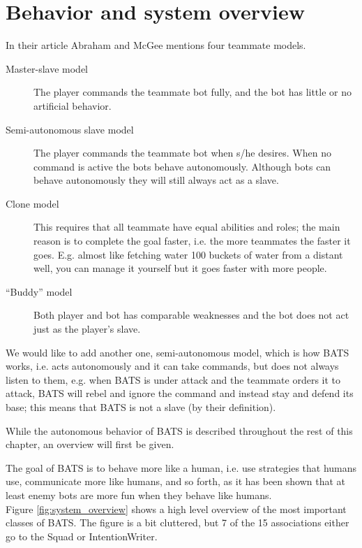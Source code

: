\section{Behavior and system overview}
In their article\cite{abraham10} Abraham and McGee mentions four teammate models.
\begin{description}
	\item[Master-slave model] The player commands the teammate bot fully, and the bot has little or
	  no artificial behavior.
	\item[Semi-autonomous slave model] The player commands the teammate bot when s/he desires. When
	  no command is active the bots behave autonomously. Although bots can behave autonomously they
	  will still always act as a slave.
	\item[Clone model] This requires that all teammate have equal abilities and roles; the main
	  reason is to complete the goal faster, i.e. the more teammates the faster it goes. E.g. almost
	  like fetching water 100 buckets of water from a distant well, you can manage it yourself but
	  it goes faster with more people.
	\item[“Buddy” model] Both player and bot has comparable weaknesses and the bot does not act just
	  as the player’s slave.
\end{description}
We would like to add another one, semi-autonomous model, which is how BATS works, i.e. acts
autonomously and it can take commands, but does not always listen to them, e.g. when BATS is under
attack and the teammate orders it to attack, BATS will rebel and ignore the command and instead stay
and defend its base; this means that BATS is not a slave (by their definition).

While the autonomous behavior of BATS is described throughout the rest of this chapter, an overview
will first be given.

The goal of BATS is to behave more like a human, i.e. use strategies that humans use, communicate
more like humans, and so forth, as it has been shown that at least enemy bots are more fun when they
behave like humans\cite{soni08}. \\



Figure \ref{fig:system_overview} shows a high level overview of the most important classes of BATS.
The figure is a bit cluttered, but 7 of the 15 associations either go to the Squad or
IntentionWriter.

